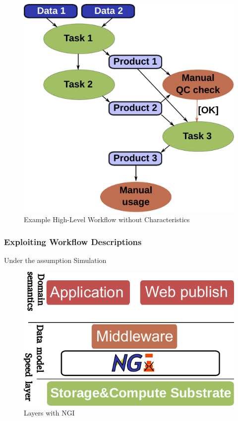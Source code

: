\documentclass[a4paper, twocolumn]{article}
\begin{document}
\begin{figure}[b]
  \centering
  \includegraphics[width=0.75\columnwidth]{workflow}
  \caption{Example High-Level Workflow without Characteristics}
  \label{fig:workflow}
\end{figure}

\subsubsection{Exploiting Workflow Descriptions}

Under the assumption
Simulation





\begin{figure}[b]
  \centering
  \includegraphics[width=0.75\columnwidth]{layers-ngi}
  \caption{Layers with NGI}
  \label{fig:ngilayers}
\end{figure}



\end{document}
